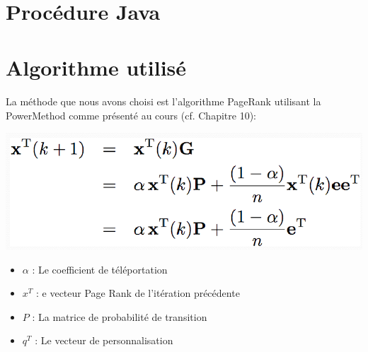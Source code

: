 \documentclass[10pt,a4paper]{article}
\begin{document}



\newpage

\section{Procédure Java}
\section{Algorithme utilisé}

\paragraph{}La méthode que nous avons choisi est l'algorithme PageRank utilisant la PowerMethod comme présenté au cours (cf. Chapitre 10):
\begin{center}
\includegraphics[scale=0.4]{PowerMethod.png} 
\end{center}
\vspace{1cm}
\begin{itemize}
	\item $\alpha$ : Le coefficient de téléportation
	\item $x^{T}$	: e vecteur Page Rank de l'itération précédente
	\item $P$	: La matrice de probabilité de transition
	\item $q^{T}$ : Le vecteur de personnalisation
\end{itemize}
\end{document}
